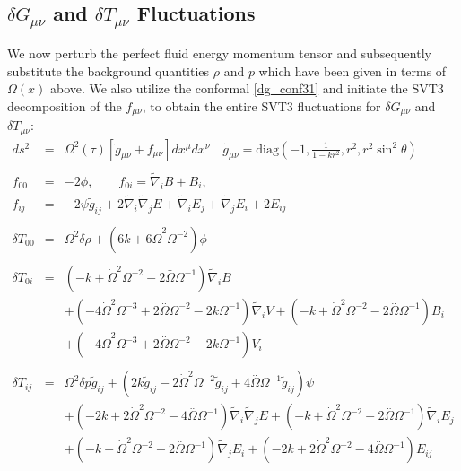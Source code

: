 \subsection{$\delta G_{\mu\nu}$ and $\delta T_{\mu\nu}$ Fluctuations}
We now perturb the perfect fluid energy momentum tensor and subsequently substitute the background quantities $\rho$ and $p$ which have been given in terms of $\Omega(x)$ above. We also utilize the conformal \eqref{dg_conf31} and initiate the SVT3 decomposition of the $f_{\mu\nu}$, to obtain the entire SVT3 fluctuations for $\delta G_{\mu\nu}$ and $\delta T_{\mu\nu}$:
\begin{eqnarray}
ds^2 &=& \Omega^2(\tau)[\tilde g_{\mu\nu}+ f_{\mu\nu}] dx^\mu dx^\nu
\quad 
\tilde g_{\mu\nu} = \text{diag}\left(-1,\frac{1}{1-kr^2},r^2,r^2\sin^2\theta\right)
\nonumber\\ \\
f_{00} &=& -2\phi,\qquad f_{0i} = \tilde\nabla_i B + B_i,
\nonumber\\
f_{ij} &=& -2\psi \tilde g_{ij} + 2\tilde\nabla_i\tilde\nabla_j E + 
\tilde\nabla_i E_j +\tilde\nabla_j E_i + 2E_{ij}
\label{svt}
\\ \nonumber\\
\delta T_{00}&=& \Omega^2 \delta \rho + (6 k + 6 \dot{\Omega}^2 \Omega^{-2}) \phi 
\\  \nonumber\\ 
\delta T_{0i}&=& (- k + \dot{\Omega}^2 \Omega^{-2} - 2 \overset{..}{\Omega} \Omega^{-1}) \tilde{\nabla}_{i}B \nonumber \\ 
&& + (-4 \dot{\Omega}^2 \Omega^{-3} + 2 \overset{..}{\Omega} \Omega^{-2} - 2 k \Omega^{-1}) \tilde{\nabla}_{i}V+(- k + \dot{\Omega}^2 \Omega^{-2} - 2 \overset{..}{\Omega} \Omega^{-1}) B_{i} \nonumber \\ 
&& + (-4 \dot{\Omega}^2 \Omega^{-3} + 2 \overset{..}{\Omega} \Omega^{-2} - 2 k \Omega^{-1}) V_{i}
\\  \nonumber\\ 
\delta T_{ij}&=& \Omega^2 \delta p \tilde{g}_{ij} + (2 k \tilde{g}_{ij} - 2 \dot{\Omega}^2 \Omega^{-2} \tilde{g}_{ij} + 4 \overset{..}{\Omega} \Omega^{-1} \tilde{g}_{ij}) \psi \\ 
&& + (-2 k + 2 \dot{\Omega}^2 \Omega^{-2} - 4 \overset{..}{\Omega} \Omega^{-1}) \tilde{\nabla}_{i}\tilde{\nabla}_{j}E+(- k + \dot{\Omega}^2 \Omega^{-2} - 2 \overset{..}{\Omega} \Omega^{-1}) \tilde{\nabla}_{i}E_{j} \nonumber \\ 
&& + (- k + \dot{\Omega}^2 \Omega^{-2} - 2 \overset{..}{\Omega} \Omega^{-1}) \tilde{\nabla}_{j}E_{i}+(-2 k + 2 \dot{\Omega}^2 \Omega^{-2} - 4 \overset{..}{\Omega} \Omega^{-1}) E_{ij}

\end{eqnarray}
